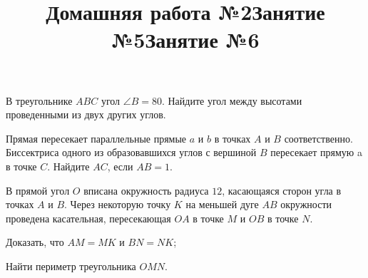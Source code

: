 \newpage
\title{Домашняя работа №2}
\begin{listofex}
	\item {}
	\item {}
	\item {}
	\item {}
	\item В треугольнике \( ABC \) угол \( \angle B = 80 \). Найдите угол между высотами проведенными из двух других углов.
\end{listofex}
\newpage
\title{Занятие №5}
\begin{listofex}
	\item Прямая пересекает параллельные прямые \( a \) и \( b \) в точках \( A \) и \( B \) соответственно. Биссектриса одного из образовавшихся углов с вершиной \( B \) пересекает прямую a в точке \( C \). Найдите \( AC \), если \( AB = 1 \).
	\item {}
	\item {}
	\item {}
	\item {}
	\item {}
	\item {}
	\item {}
\end{listofex}
\newpage
\title{Занятие №6}
\begin{listofex}
	\item {}
	\item {}
	\item {}
	\item {}
	\item В прямой угол \( O \) вписана окружность радиуса \( 12 \), касающаяся сторон угла в точках \( A  \) и \( B \). Через некоторую точку \( K \) на меньшей дуге \( AB  \) окружности проведена касательная, пересекающая \( OA \) в точке \( M \) и \( OB \) в точке \( N \).
	\begin{enumcols}[itemcolumns=1]
		\item Доказать, что \( AM=MK \) и \( BN=NK \);
		\item Найти периметр треугольника \( OMN \).
	\end{enumcols} 
	\item {}
	\item {}
\end{listofex}
